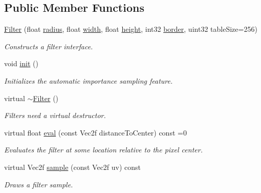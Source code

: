 \subsection*{Public Member Functions}
\begin{DoxyCompactItemize}
\item 
\hyperlink{classembree_1_1_filter_a8cb0d91f27a7a4754d2cc2e0234a64a4}{Filter} (float \hyperlink{classembree_1_1_filter_a1c8f51881c3ffe113aa4433bb0e33c3a}{radius}, float \hyperlink{classembree_1_1_filter_a82efb36dcfd8c1b88b924b73750126e7}{width}, float \hyperlink{classembree_1_1_filter_a3e7d76c1870c7a37ff9cbad3b6eeff61}{height}, int32 \hyperlink{classembree_1_1_filter_ab2f83d581309ffb8807c891326291712}{border}, uint32 tableSize=256)
\begin{DoxyCompactList}\small\item\em Constructs a filter interface. \item\end{DoxyCompactList}\item 
void \hyperlink{classembree_1_1_filter_a33c5fc5aa9807c91cf13d59a1fb67590}{init} ()
\begin{DoxyCompactList}\small\item\em Initializes the automatic importance sampling feature. \item\end{DoxyCompactList}\item 
virtual \hyperlink{classembree_1_1_filter_a7e39ea23eb4ee9a806b4358ee2d0d679}{$\sim$Filter} ()
\begin{DoxyCompactList}\small\item\em Filters need a virtual destructor. \item\end{DoxyCompactList}\item 
virtual float \hyperlink{classembree_1_1_filter_affb7e4c8efedfed1fa2b636d439c3dc2}{eval} (const Vec2f distanceToCenter) const =0
\begin{DoxyCompactList}\small\item\em Evaluates the filter at some location relative to the pixel center. \item\end{DoxyCompactList}\item 
virtual Vec2f \hyperlink{classembree_1_1_filter_acd5773d409b5d97fb108341dfa303ac3}{sample} (const Vec2f uv) const 
\begin{DoxyCompactList}\small\item\em Draws a filter sample. \item\end{DoxyCompactList}\end{DoxyCompactItemize}
